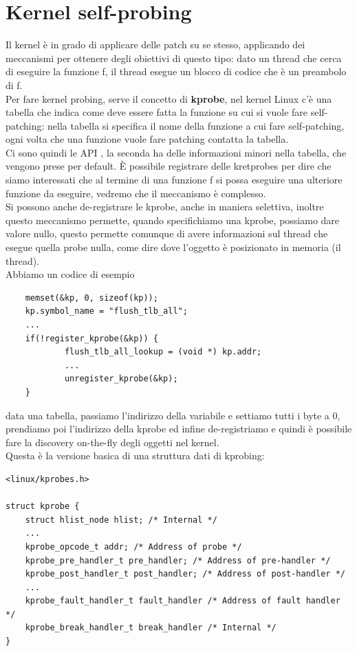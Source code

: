 \documentclass[12pt, oneside]{extbook}
\begin{document}
\section{Kernel self-probing}
Il kernel è in grado di applicare delle patch su se stesso, applicando dei meccanismi per ottenere degli obiettivi di questo tipo: dato un thread che cerca di eseguire la funzione f, il thread esegue un blocco di codice che è un preambolo di f.\\Per fare kernel probing, serve il concetto di \textbf{kprobe}, nel kernel Linux c'è una tabella che indica come deve essere fatta la funzione su cui si vuole fare self-patching: nella tabella si specifica il nome della funzione a cui fare self-patching, ogni volta che una funzione vuole fare patching contatta la tabella.\\Ci sono quindi le API , la seconda ha delle informazioni minori nella tabella, che vengono prese per default. È possibile registrare delle kretprobes per dire che siamo interessati che al termine di una funzione f si possa eseguire una ulteriore funzione da eseguire, vedremo che il meccanismo è complesso.\\ Si possono anche de-registrare le kprobe, anche in maniera selettiva, inoltre questo meccanismo permette, quando specifichiamo una kprobe, possiamo dare valore nullo, questo permette comunque di avere informazioni sul thread che esegue quella probe nulla, come dire dove l'oggetto è posizionato in memoria (il thread).\\Abbiamo un codice di esempio
\begin{lstlisting}
	memset(&kp, 0, sizeof(kp));
	kp.symbol_name = "flush_tlb_all";
	...
	if(!register_kprobe(&kp)) {
			flush_tlb_all_lookup = (void *) kp.addr;
			...
			unregister_kprobe(&kp);
	}
\end{lstlisting}
data una tabella, passiamo l'indirizzo della variabile e settiamo tutti i byte a 0, prendiamo poi l'indirizzo della kprobe ed infine de-registriamo e quindi è possibile fare la discovery on-the-fly degli oggetti nel kernel.\\Questa è la versione basica di una struttura dati di kprobing:
\begin{lstlisting}
<linux/kprobes.h>

struct kprobe {
	struct hlist_node hlist; /* Internal */
	...
	kprobe_opcode_t addr; /* Address of probe */
	kprobe_pre_handler_t pre_handler; /* Address of pre-handler */
	kprobe_post_handler_t post_handler; /* Address of post-handler */
	...
	kprobe_fault_handler_t fault_handler /* Address of fault handler */
	kprobe_break_handler_t break_handler /* Internal */
}
\end{lstlisting}
\end{document}
